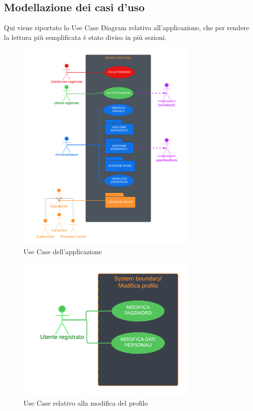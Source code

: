 \subsection{Modellazione dei casi d'uso}
    \begin{flushleft}
        Qui viene riportato lo Use Case Diagram relativo all'applicazione, che per rendere la lettura più semplificata è stato diviso in più sezioni.
    \end{flushleft}
    
    \begin{figure}[H]
        \centering
        \includegraphics[width=0.8\textwidth]{assets/diagrammi/Use-Case/Use-Case Generale.png}
        \caption{Use Case dell'applicazione}
        \label{fig:ucdGenerale}
    \end{figure}
    
    \begin{figure}[H]
        \centering
        \includegraphics[width=0.8\textwidth]{assets/diagrammi/Use-Case/Modifica Profilo.png}
        \caption{Use Case relativo alla modifica del profilo}
        \label{fig:ucdModProfile}
    \end{figure}

